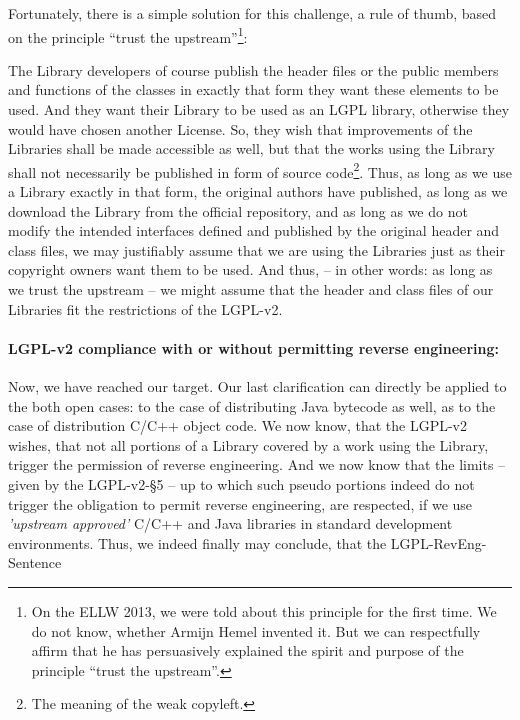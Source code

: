 Fortunately, there is a simple solution for this challenge, a rule of thumb,
based on the principle \enquote{trust the upstream}\footnote{On the ELLW 2013,
we were told about this principle for the first time. We do not know, whether
Armijn Hemel invented it. But we can respectfully affirm that he has
persuasively explained the spirit and purpose of the principle \enquote{trust
the upstream}.}:

The Library developers of course publish the header files or the public members
and functions of the classes in exactly that form they want these elements to be
used. And they want their Library to be used as an LGPL library, otherwise they
would have chosen another License. So, they wish that improvements of the
Libraries shall be made accessible as well, but that the works using the Library
shall not necessarily be published in form of source code\footnote{The meaning
of the weak copyleft.}. Thus, as long as we use a Library exactly in that form,
the original authors have published, as long as we download the Library from
the official repository, and as long as we do not modify the intended interfaces
defined and published by the original header and class files, we may justifiably
assume that we are using the Libraries just as their copyright owners want them
to be used. And thus, -- in other words: as long as we trust the upstream -- we
might assume that the header and class files of our Libraries fit the
restrictions of the LGPL-v2.

\paragraph{LGPL-v2 compliance with or without permitting reverse engineering:} 
\label{RevEngLgpl2ComplianceByRenverseEngine}

Now, we have reached our target. Our last clarification can directly be applied
to the both open cases: to the case of distributing Java bytecode as well, as to
the case of distribution C/C++ object code. We now know, that the LGPL-v2
wishes, that not all portions of a Library covered by a work using the Library,
trigger the permission of reverse engineering. And we now know that the limits
-- given by the LGPL-v2-§5 -- up to which such pseudo portions indeed do not
trigger the obligation to permit reverse engineering, are respected, if we use
\emph{'upstream approved'} C/C++ and Java libraries in standard development
environments. Thus, we indeed finally may conclude, that the
LGPL-RevEng-Sentence

